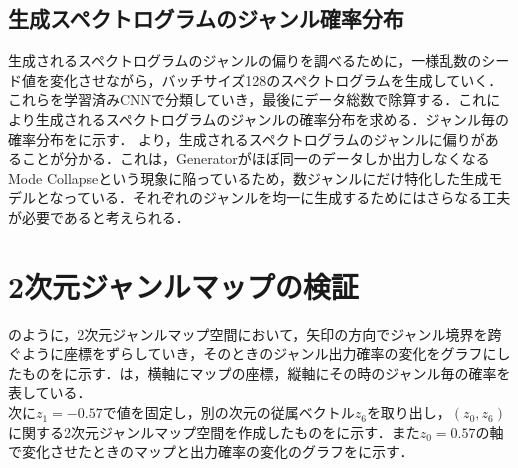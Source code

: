 \subsection{生成スペクトログラムのジャンル確率分布}
生成されるスペクトログラムのジャンルの偏りを調べるために，一様乱数のシード値を変化させながら，バッチサイズ128のスペクトログラムを生成していく．これらを学習済みCNNで分類していき，最後にデータ総数で除算する．これにより生成されるスペクトログラムのジャンルの確率分布を求める．ジャンル毎の確率分布をに示す．
より，生成されるスペクトログラムのジャンルに偏りがあることが分かる．これは，Generatorがほぼ同一のデータしか出力しなくなるMode Collapseという現象に陥っているため，数ジャンルにだけ特化した生成モデルとなっている．それぞれのジャンルを均一に生成するためにはさらなる工夫が必要であると考えられる．
\begin{table}[htbp]
	\begin{center}
		\caption{ジャンル毎の生成確率分布}
		\label{tab:prob-dist}
	\end{center}
\end{table}


\newpage
\section{2次元ジャンルマップの検証}
のように，2次元ジャンルマップ空間において，矢印の方向でジャンル境界を跨ぐように座標をずらしていき，そのときのジャンル出力確率の変化をグラフにしたものをに示す．は，横軸にマップの座標，縦軸にその時のジャンル毎の確率を表している．\\
次に$z_1=-0.57$で値を固定し，別の次元の従属ベクトル$z_6$を取り出し，$(z_0, z_6)$に関する2次元ジャンルマップ空間を作成したものをに示す．また$z_0=0.57$の軸で変化させたときのマップと出力確率の変化のグラフをに示す．



